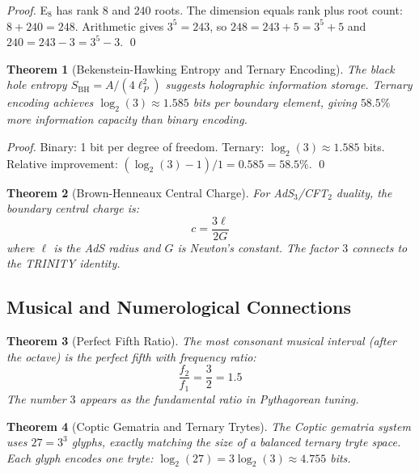 \documentclass[aps,prd,preprint,superscriptaddress,showpacs,nofootinbib,longbibliography]{revtex4-2}
\newtheorem{theorem}{Theorem}
\begin{document}
\begin{proof}
E$_8$ has rank 8 and $240$ roots. The dimension equals rank plus root count: $8 + 240 = 248$. Arithmetic gives $3^5 = 243$, so $248 = 243 + 5 = 3^5 + 5$ and $240 = 243 - 3 = 3^5 - 3$. \qed
\end{proof}

\begin{theorem}[Bekenstein-Hawking Entropy and Ternary Encoding]
\label{thm:entropy}
The black hole entropy $S_{\text{BH}} = A / (4\ell_P^2)$ suggests holographic information storage. Ternary encoding achieves $\log_2(3) \approx 1.585$ bits per boundary element, giving $58.5\%$ more information capacity than binary encoding.
\end{theorem}

\begin{proof}
Binary: 1 bit per degree of freedom. Ternary: $\log_2(3) \approx 1.585$ bits. Relative improvement: $(\log_2(3) - 1)/1 = 0.585 = 58.5\%$. \qed
\end{proof}

\begin{theorem}[Brown-Henneaux Central Charge]
\label{thm:central}
For AdS$_3$/CFT$_2$ duality, the boundary central charge is:
\begin{equation}
c = \frac{3\ell}{2G}
\end{equation}
where $\ell$ is the AdS radius and $G$ is Newton's constant. The factor $3$ connects to the TRINITY identity.
\end{theorem}

\subsection{Musical and Numerological Connections}
\label{sec:music_numerology}

\begin{theorem}[Perfect Fifth Ratio]
\label{thm:perfect_fifth}
The most consonant musical interval (after the octave) is the perfect fifth with frequency ratio:
\begin{equation}
\frac{f_2}{f_1} = \frac{3}{2} = 1.5
\end{equation}
The number $3$ appears as the fundamental ratio in Pythagorean tuning.
\end{theorem}

\begin{theorem}[Coptic Gematria and Ternary Trytes]
\label{thm:gematria}
The Coptic gematria system uses $27 = 3^3$ glyphs, exactly matching the size of a balanced ternary tryte space. Each glyph encodes one tryte: $\log_2(27) = 3\log_2(3) \approx 4.755$ bits.
\end{theorem}
\end{document}
